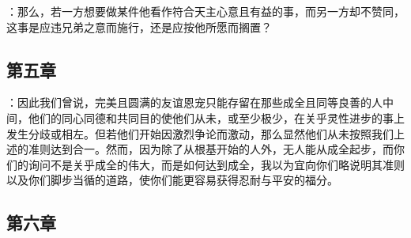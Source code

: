 ：那么，若一方想要做某件他看作符合天主心意且有益的事，而另一方却不赞同，这事是应违兄弟之意而施行，还是应按他所愿而搁置？\par


\subsection{第五章}

\par

：因此我们曾说，完美且圆满的友谊恩宠只能存留在那些成全且同等良善的人中间，他们的同心同德和共同目的使他们从未，或至少极少，在关乎灵性进步的事上发生分歧或相左。但若他们开始因激烈争论而激动，那么显然他们从未按照我们上述的准则达到合一。然而，因为除了从根基开始的人外，无人能从成全起步，而你们的询问不是关乎成全的伟大，而是如何达到成全，我以为宜向你们略说明其准则以及你们脚步当循的道路，使你们能更容易获得忍耐与平安的福分。\par


\subsection{第六章}

\par

